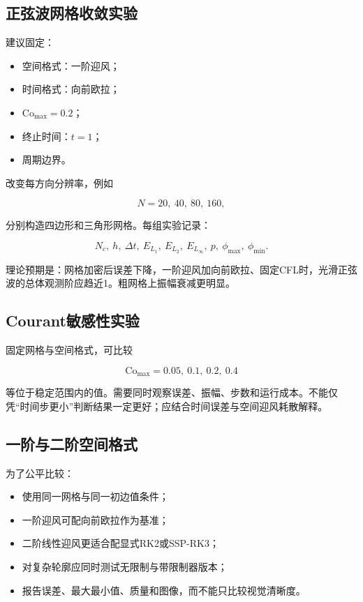\documentclass[UTF8,12pt,a4paper,fontset=fandol]{ctexart}
\numberwithin{equation}{section}
\newcommand{\Cmax}{\mathrm{Co}_{\max}}
\begin{document}
\subsection{正弦波网格收敛实验}

建议固定：

\begin{itemize}
  \item 空间格式：一阶迎风；
  \item 时间格式：向前欧拉；
  \item $\Cmax=0.2$；
  \item 终止时间：$t=1$；
  \item 周期边界。
\end{itemize}

改变每方向分辨率，例如

\begin{equation}
  N=20,\ 40,\ 80,\ 160,
\end{equation}

分别构造四边形和三角形网格。每组实验记录：

\begin{equation}
  N_c,\ h,\ \Delta t,\ E_{L_1},\ E_{L_2},\
  E_{L_\infty},\ p,\ \phi_{\max},\ \phi_{\min}.
\end{equation}

理论预期是：网格加密后误差下降，一阶迎风加向前欧拉、固定CFL时，光滑正弦波的总体观测阶应趋近1。粗网格上振幅衰减更明显。

\subsection{Courant敏感性实验}

固定网格与空间格式，可比较

\begin{equation}
  \Cmax=0.05,\ 0.1,\ 0.2,\ 0.4
\end{equation}

等位于稳定范围内的值。需要同时观察误差、振幅、步数和运行成本。不能仅凭“时间步更小”判断结果一定更好；应结合时间误差与空间迎风耗散解释。

\subsection{一阶与二阶空间格式}

为了公平比较：

\begin{itemize}
  \item 使用同一网格与同一初边值条件；
  \item 一阶迎风可配向前欧拉作为基准；
  \item 二阶线性迎风更适合配显式RK2或SSP-RK3；
  \item 对复杂轮廓应同时测试无限制与带限制器版本；
  \item 报告误差、最大最小值、质量和图像，而不能只比较视觉清晰度。
\end{itemize}
\end{document}
